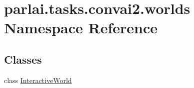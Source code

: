\hypertarget{namespaceparlai_1_1tasks_1_1convai2_1_1worlds}{}\section{parlai.\+tasks.\+convai2.\+worlds Namespace Reference}
\label{namespaceparlai_1_1tasks_1_1convai2_1_1worlds}
\subsection*{Classes}
\begin{DoxyCompactItemize}
\item 
class \hyperlink{classparlai_1_1tasks_1_1convai2_1_1worlds_1_1InteractiveWorld}{Interactive\+World}
\end{DoxyCompactItemize}
